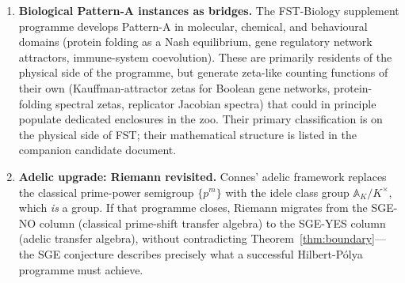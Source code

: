 \documentclass[11pt]{article}
\theoremstyle{definition}
\theoremstyle{remark}
\begin{document}
\begin{enumerate}
\begin{itemize}
  conjecturally flow-noncompact, \textbf{SGE-YES}. Temperature as
  continuous parameter; the Lee-Yang circle theorem plays the role
  of an RH-analog. Statistical-mechanical cousin of CRM.
  \item \textbf{Bost-Connes system} (1995): a quantum-statistical
  realisation of $\zeta(s)$ as partition function with spontaneous
  symmetry breaking at $\beta = 1$. Sits on the bridge between the
  arithmetic and flow classes and connects the zoo directly to
  Connes' adelic framework \cite{Connes1999, Connes2026}.
  \end{itemize}
  Each of these deserves a dedicated FST-Mathematics supplement in
  due course. A second tier of twelve further constructions
  (Epstein, Witten-zeta, multiple-zeta-values, Hurwitz, Lerch,
  Arakelov, motivic $L$, chiral-zeta, RG-zetas, Gromov-Witten,
  Reidemeister torsion, QFT spectral zetas) and a separate column
  of biological Pattern-A-derived zetas (Kauffman-attractor,
  protein-folding spectral, replicator Jacobian) are catalogued in
  the companion tree document \cite{CandidatesMasterList}.

\item \textbf{Biological Pattern-A instances as bridges.} The
  FST-Biology supplement programme \cite{FSTBiology} develops
  Pattern-A in molecular, chemical, and behavioural domains
  (protein folding as a Nash equilibrium, gene regulatory network
  attractors, immune-system coevolution). These are primarily
  residents of the physical side of the programme, but generate
  zeta-like counting functions of their own (Kauffman-attractor
  zetas for Boolean gene networks, protein-folding spectral zetas,
  replicator Jacobian spectra) that could in principle populate
  dedicated enclosures in the zoo. Their primary classification
  is on the physical side of FST; their mathematical structure is
  listed in the companion candidate document.

\item \textbf{Adelic upgrade: Riemann revisited.} Connes' adelic
  framework \cite{Connes1999, Connes2026} replaces the classical
  prime-power semigroup $\{p^m\}$ with the idele class group
  $\mathbb{A}_K/K^\times$, which \emph{is} a group. If that
  programme closes, Riemann migrates from the SGE-NO column
  (classical prime-shift transfer algebra) to the SGE-YES column
  (adelic transfer algebra), without contradicting
  Theorem~\ref{thm:boundary}---the SGE conjecture describes
  precisely what a successful Hilbert-P\'olya programme must
  achieve.


\end{enumerate}
\end{document}
